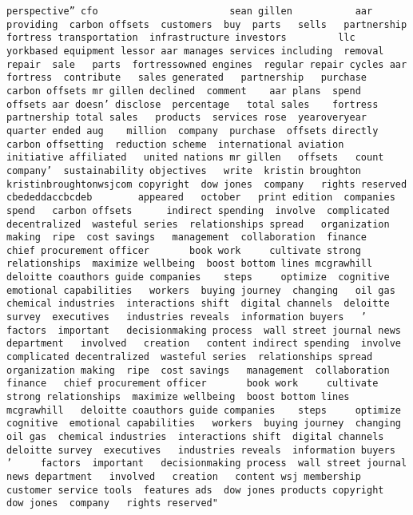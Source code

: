 \documentclass[
]{article}
\begin{document}
\begin{verbatim}
perspective” cfo                       sean gillen           aar  providing  carbon offsets  customers  buy  parts   sells   partnership                        fortress transportation  infrastructure investors         llc   yorkbased equipment lessor aar manages services including  removal repair  sale   parts  fortressowned engines  regular repair cycles aar  fortress  contribute   sales generated   partnership   purchase  carbon offsets mr gillen declined  comment    aar plans  spend   offsets aar doesn’ disclose  percentage   total sales    fortress partnership total sales   products  services rose  yearoveryear   quarter ended aug    million  company  purchase  offsets directly   carbon offsetting  reduction scheme  international aviation  initiative affiliated   united nations mr gillen   offsets   count   company’  sustainability objectives   write  kristin broughton  kristinbroughtonwsjcom copyright  dow jones  company   rights reserved cbededdaccbcdeb        appeared   october   print edition  companies spend   carbon offsets      indirect spending  involve  complicated decentralized  wasteful series  relationships spread   organization making  ripe  cost savings   management  collaboration  finance   chief procurement officer       book work     cultivate strong relationships  maximize wellbeing  boost bottom lines mcgrawhill   deloitte coauthors guide companies    steps     optimize  cognitive  emotional capabilities   workers  buying journey  changing   oil gas  chemical industries  interactions shift  digital channels  deloitte survey  executives   industries reveals  information buyers   ’     factors  important   decisionmaking process  wall street journal news department   involved   creation   content indirect spending  involve  complicated decentralized  wasteful series  relationships spread   organization making  ripe  cost savings   management  collaboration  finance   chief procurement officer       book work     cultivate strong relationships  maximize wellbeing  boost bottom lines mcgrawhill   deloitte coauthors guide companies    steps     optimize  cognitive  emotional capabilities   workers  buying journey  changing   oil gas  chemical industries  interactions shift  digital channels  deloitte survey  executives   industries reveals  information buyers   ’     factors  important   decisionmaking process  wall street journal news department   involved   creation   content wsj membership customer service tools  features ads  dow jones products copyright   dow jones  company   rights reserved"                                                                                                                                                                                                                                                                                                                                                                                                                                                                                                                                                                                                                                                                                                                                                                                       
\end{verbatim}
\end{document}
